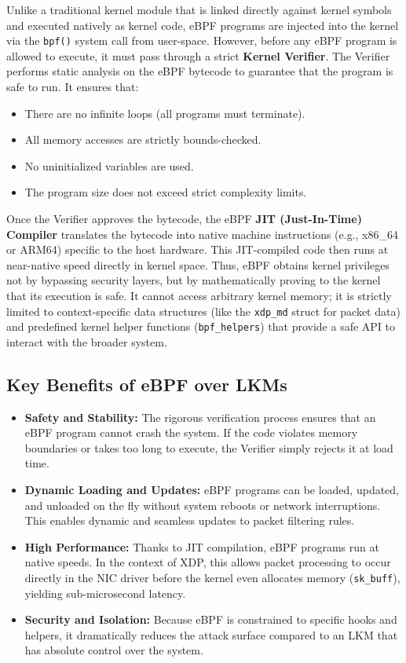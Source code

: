 \documentclass[11pt,a4paper]{article}
\begin{document}
Unlike a traditional kernel module that is linked directly against kernel symbols and executed natively as kernel code, eBPF programs are injected into the kernel via the \texttt{bpf()} system call from user-space.
However, before any eBPF program is allowed to execute, it must pass through a strict \textbf{Kernel Verifier}.
The Verifier performs static analysis on the eBPF bytecode to guarantee that the program is safe to run.
It ensures that:
\begin{itemize}
    \item There are no infinite loops (all programs must terminate).
    \item All memory accesses are strictly bounds-checked.
    \item No uninitialized variables are used.
    \item The program size does not exceed strict complexity limits.
\end{itemize}

Once the Verifier approves the bytecode, the eBPF \textbf{JIT (Just-In-Time) Compiler} translates the bytecode into native machine instructions (e.g., x86\_64 or ARM64) specific to the host hardware.
This JIT-compiled code then runs at near-native speed directly in kernel space.
Thus, eBPF obtains kernel privileges not by bypassing security layers, but by mathematically proving to the kernel that its execution is safe.
It cannot access arbitrary kernel memory; it is strictly limited to context-specific data structures (like the \texttt{xdp\_md} struct for packet data) and predefined kernel helper functions (\texttt{bpf\_helpers}) that provide a safe API to interact with the broader system.

\subsection{Key Benefits of eBPF over LKMs}

\begin{itemize}
    \item \textbf{Safety and Stability:} The rigorous verification process ensures that an eBPF program cannot crash the system.
If the code violates memory boundaries or takes too long to execute, the Verifier simply rejects it at load time.
    \item \textbf{Dynamic Loading and Updates:} eBPF programs can be loaded, updated, and unloaded on the fly without system reboots or network interruptions.
This enables dynamic and seamless updates to packet filtering rules.
    \item \textbf{High Performance:} Thanks to JIT compilation, eBPF programs run at native speeds.
In the context of XDP, this allows packet processing to occur directly in the NIC driver before the kernel even allocates memory (\texttt{sk\_buff}), yielding sub-microsecond latency.
    \item \textbf{Security and Isolation:} Because eBPF is constrained to specific hooks and helpers, it dramatically reduces the attack surface compared to an LKM that has absolute control over the system.
\end{itemize}
\end{document}
